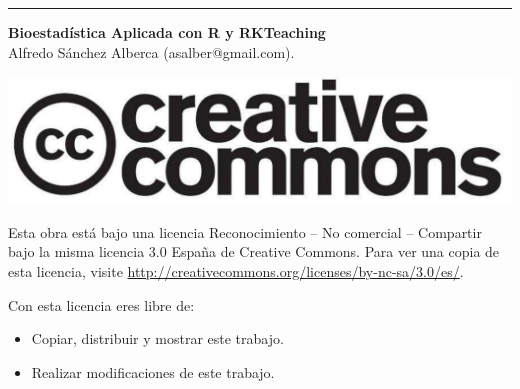 \thispagestyle{empty}
\null
\vfill
\hrule depth 3pt
\smallskip
\sffamily

\noindent \textbf{Bioestadística Aplicada con R y RKTeaching}\\
Alfredo Sánchez Alberca (asalber@gmail.com).

\bigskip
\begin{center}
\includegraphics[scale=0.1]{img/cc-logo}
\end{center}

\medskip

\small
Esta obra está bajo una licencia Reconocimiento -- No comercial -- Compartir bajo la misma licencia 3.0 España de Creative Commons.
Para ver una copia de esta licencia, visite \url{http://creativecommons.org/licenses/by-nc-sa/3.0/es/}.

\medskip
Con esta licencia eres libre de:
\begin{itemize}
\item Copiar, distribuir y mostrar este trabajo.
\item Realizar modificaciones de este trabajo.
\end{itemize}

